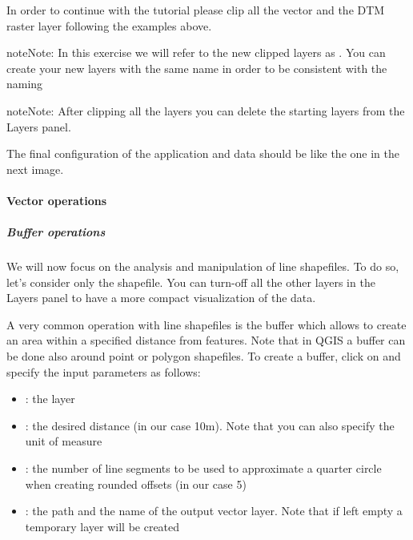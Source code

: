 \documentclass[letterpaper,10pt,english]{sphinxmanual}
\begin{document}
In order to continue with the tutorial please clip all the vector and the DTM raster layer following the examples above.

\begin{sphinxadmonition}{note}{Note:}
In this exercise we will refer to the new clipped layers as . You can create your
new layers with the same name in order to be consistent with the naming
\end{sphinxadmonition}

\begin{sphinxadmonition}{note}{Note:}
After clipping all the layers you can delete the starting layers from the Layers panel.
\end{sphinxadmonition}

The final configuration of the application and data should be like the one in the next image.

\noindent{}


\paragraph{Vector operations}
\label{\detokenize{vector/vector:vector-operations}}\label{\detokenize{vector/vector::doc}}

\subparagraph{Buffer operations}
\label{\detokenize{vector/buffer:buffer-operations}}\label{\detokenize{vector/buffer::doc}}
We will now focus on the analysis and manipulation of line shapefiles. To do so, let’s consider only the  shapefile.
You can turn-off all the other layers in the Layers panel to have a more compact visualization of the data.

\noindent{}

A very common operation with line shapefiles is the buffer which allows to create an area within a specified distance from features.
Note that in QGIS a buffer can be done also around point or polygon shapefiles. To create a buffer, click on
 and specify the input parameters as follows:
\begin{itemize}
\item {} 
: the  layer

\item {} 
: the desired distance (in our case 10m). Note that you can also specify the unit of measure

\item {} 
: the number of line segments to be used to approximate a quarter circle when creating rounded offsets (in our case 5)

\item {} 
: the path and the name of the output vector layer. Note that if left empty a temporary layer will be created

\end{itemize}
\end{document}
